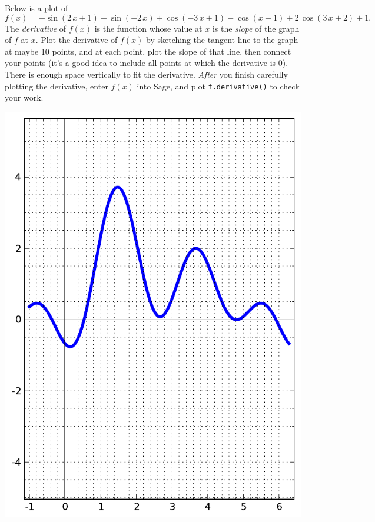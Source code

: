 Below is a plot of $$f(x)=-\sin\left(2 \, x + 1\right) - \sin\left(-2 \, x\right) + \cos\left(-3 \, x + 1\right) - \cos\left(x + 1\right) + 2 \, \cos\left(3 \, x + 2\right) + 1.$$  The {\em \color{red}derivative} of $f(x)$ is the function whose value at $x$ is the {\em slope} of the graph of $f$ at $x$.  Plot the derivative of $f(x)$ by sketching the tangent line to the graph at maybe 10 points, and at each point, plot the slope of that line, then connect your points (it's a good idea to include all points at which the derivative is 0).  There is enough space vertically to fit the derivative.  {\em After} you finish carefully plotting the derivative, enter $f(x)$ into Sage, and plot {\color{blue}\verb|f.derivative()|} to check your work.
\begin{center}\includegraphics{functions/72.pdf}\end{center}\newpage

